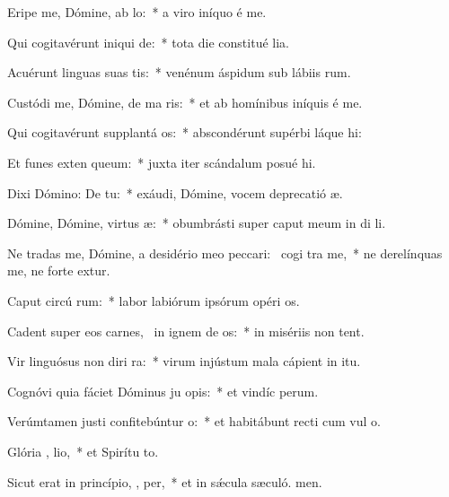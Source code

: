 \item Eripe me, Dómine, ab  lo:~* a viro iníquo é me.
\item Qui cogitavérunt iniqui  de:~* tota die constitué lia.
\item Acuérunt linguas suas  tis:~* venénum áspidum sub lábiis rum.
\item Custódi me, Dómine, de ma ris:~* et ab homínibus iníquis é me.
\item Qui cogitavérunt supplantá  os:~* abscondérunt supérbi láque hi:
\item Et funes exten  queum:~* juxta iter scándalum posué hi.
\item Dixi Dómino: De   tu:~* exáudi, Dómine, vocem deprecatió æ.
\item Dómine, Dómine, virtus  æ:~* obumbrásti super caput meum in di li.
\item Ne tradas me, Dómine, a desidério meo peccari:~\pscross{} cogi tra me,~* ne derelínquas me, ne forte extur.
\item Caput circú rum:~* labor labiórum ipsórum opéri os.
\item Cadent super eos carnes,~\pscross{} in ignem de os:~* in misériis non tent.
\item Vir linguósus non diri  ra:~* virum injústum mala cápient in itu.
\item Cognóvi quia fáciet Dóminus ju opis:~* et vindíc perum.
\item Verúmtamen justi confitebúntur  o:~* et habitábunt recti cum vul o.
\item Glória ,  lio,~* et Spirítu to.
\item Sicut erat in princípio,  ,  per,~* et in sǽcula sæculó. men.
